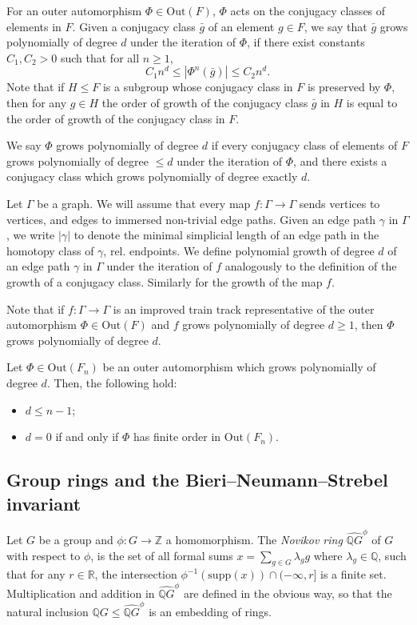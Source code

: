 For an outer automorphism $\Phi \in \mathrm{Out}(F)$, $\Phi$ acts on the conjugacy classes of elements in $F$. Given a conjugacy class $\bar{g}$ of an element $g\in F$, we say that $\bar{g}$ grows polynomially of degree $d$ under the iteration of $\Phi$, if there exist constants $C_1, C_2 > 0$ such that for all $n\geq 1$, \[C_1 n^d \leq |\Phi^n(\bar{g})| \leq C_2 n^d.\] Note that if $H \leq F$ is a subgroup whose conjugacy class in $F$ is preserved by $\Phi$, then for any $g \in H$ the order of growth of the conjugacy class $\bar{g}$ in $H$ is equal to the order of growth of the conjugacy class in $F$. 

We say $\Phi$ grows polynomially of degree $d$ if every conjugacy class of elements of $F$ grows polynomially of degree $\leq d$ under the iteration of $\Phi$, and there exists a conjugacy class which grows polynomially of degree exactly $d$.

Let $\Gamma$ be a graph. We will assume that every map $f \colon \Gamma \to \Gamma$ 
sends vertices to vertices, and edges to immersed non-trivial edge paths. Given an edge path $\gamma$ in $\Gamma$, we write $|\gamma|$ to denote the minimal simplicial length of an edge path in the homotopy class of $\gamma$, rel. endpoints.  We define polynomial growth of degree $d$ of an edge path $\gamma$ in $\Gamma$ under the iteration of $f$ analogously to the definition of the growth of a conjugacy class. Similarly for the growth of the map $f$.

Note that if $f \colon \Gamma \to \Gamma$ is an improved train track representative of the outer automorphism $\Phi \in \mathrm{Out}(F)$ and $f$ grows polynomially of degree $d \geq 1$, then $\Phi$ grows polynomially of degree $d$.
\begin{lemma}\cite{Levitt}
Let $\Phi \in \mathrm{Out}(F_n)$ be an outer automorphism which grows polynomially of degree $d$. Then, the following hold:
\begin{itemize}
    \item $d \leq n-1$;
    \item $d = 0$ if and only if $\Phi$ has finite order in $\mathrm{Out}(F_n)$.
\end{itemize}
\end{lemma}

\subsection{Group rings and the Bieri--Neumann--Strebel invariant}

Let $G$ be a group and $\phi \colon G \to \mathbb{Z}$ a homomorphism. The \emph{Novikov ring} $\widehat{\mathbb{Q}G}^{\phi}$ of $G$ with respect to $\phi$, is the set of all formal sums $x = \sum_{g\in G} {\lambda}_g g$ where $\lambda_g \in \mathbb{Q}$, such that for any $r \in \mathbb{R}$, the intersection $\phi^{-1}(\mathrm{supp}(x)) \cap (-\infty, r]$ is a finite set. Multiplication and addition in $\widehat{\mathbb{Q}G}^{\phi}$ are defined in the obvious way, so that the natural inclusion $\mathbb{Q}G \leq \widehat{\mathbb{Q}G}^{\phi}$ is an embedding of rings. 


